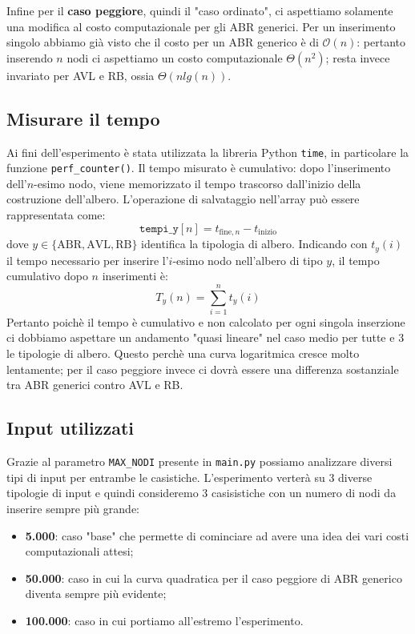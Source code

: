 Infine per il \textbf{caso peggiore}, quindi il "caso ordinato",  ci aspettiamo solamente una modifica al costo computazionale per gli ABR generici. Per un inserimento singolo abbiamo già visto che il costo per un ABR generico è di $\mathcal{O}(n)$: pertanto inserendo $n$ nodi ci aspettiamo un costo computazionale $\Theta(n^2)$; resta invece invariato per AVL e RB, ossia $\Theta(nlg(n))$.
\subsection{Misurare il tempo}
Ai fini dell'esperimento è stata utilizzata la libreria Python \texttt{time}, in particolare la funzione \texttt{perf\_counter()}.
Il tempo misurato è cumulativo: dopo l'inserimento dell'$n$-esimo nodo,
viene memorizzato il tempo trascorso dall'inizio della costruzione
dell'albero.
L'operazione di salvataggio nell'array può essere rappresentata come: \[
\texttt{tempi\_y}[n] =
t_{\mathrm{fine},n} - t_{\mathrm{inizio}}
\]
dove $y \in \{\mathrm{ABR}, \mathrm{AVL}, \mathrm{RB}\}$ identifica la
tipologia di albero.
Indicando con $t_y(i)$ il tempo necessario per inserire l'$i$-esimo
nodo nell'albero di tipo $y$, il tempo cumulativo dopo $n$ inserimenti è: \[
T_y(n) = \sum_{i=1}^{n} t_y(i)
\]
Pertanto poichè il tempo è cumulativo e non calcolato per ogni singola inserzione ci dobbiamo aspettare un andamento "quasi lineare" nel caso medio per tutte e 3 le tipologie di albero. Questo perchè una curva logaritmica cresce molto lentamente; per il caso peggiore invece ci dovrà essere una differenza sostanziale tra ABR generici contro AVL e RB.
\subsection{Input utilizzati}
\label{Sezione4.3}
Grazie al parametro \texttt{MAX\_NODI} presente in \texttt{main.py} possiamo analizzare diversi tipi di input per entrambe le casistiche. L'esperimento verterà su 3 diverse tipologie di input e quindi consideremo 3 casisistiche con un numero di nodi da inserire sempre più grande:
\begin{itemize}
	\item \textbf{5.000}: caso "base" che permette di cominciare ad avere una idea dei vari costi computazionali attesi;
	\item \textbf{50.000}: caso in cui la curva quadratica per il caso peggiore di ABR generico diventa sempre più evidente;
	\item \textbf{100.000}: caso in cui portiamo all'estremo l'esperimento.
\end{itemize}
